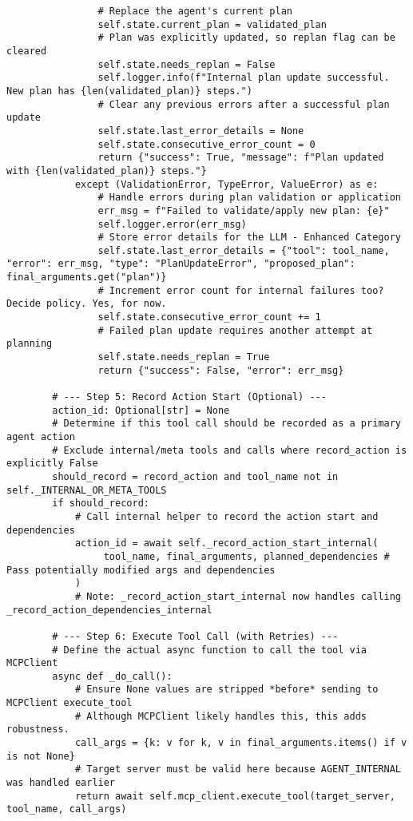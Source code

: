 \documentclass[12pt,a4paper]{article}
\begin{document}
\begin{pageablecode}
\begin{verbatim}
                # Replace the agent's current plan
                self.state.current_plan = validated_plan
                # Plan was explicitly updated, so replan flag can be cleared
                self.state.needs_replan = False
                self.logger.info(f"Internal plan update successful. New plan has {len(validated_plan)} steps.")
                # Clear any previous errors after a successful plan update
                self.state.last_error_details = None
                self.state.consecutive_error_count = 0
                return {"success": True, "message": f"Plan updated with {len(validated_plan)} steps."}
            except (ValidationError, TypeError, ValueError) as e:
                # Handle errors during plan validation or application
                err_msg = f"Failed to validate/apply new plan: {e}"
                self.logger.error(err_msg)
                # Store error details for the LLM - Enhanced Category
                self.state.last_error_details = {"tool": tool_name, "error": err_msg, "type": "PlanUpdateError", "proposed_plan": final_arguments.get("plan")}
                # Increment error count for internal failures too? Decide policy. Yes, for now.
                self.state.consecutive_error_count += 1
                # Failed plan update requires another attempt at planning
                self.state.needs_replan = True
                return {"success": False, "error": err_msg}

        # --- Step 5: Record Action Start (Optional) ---
        action_id: Optional[str] = None
        # Determine if this tool call should be recorded as a primary agent action
        # Exclude internal/meta tools and calls where record_action is explicitly False
        should_record = record_action and tool_name not in self._INTERNAL_OR_META_TOOLS
        if should_record:
            # Call internal helper to record the action start and dependencies
            action_id = await self._record_action_start_internal(
                 tool_name, final_arguments, planned_dependencies # Pass potentially modified args and dependencies
            )
            # Note: _record_action_start_internal now handles calling _record_action_dependencies_internal

        # --- Step 6: Execute Tool Call (with Retries) ---
        # Define the actual async function to call the tool via MCPClient
        async def _do_call():
            # Ensure None values are stripped *before* sending to MCPClient execute_tool
            # Although MCPClient likely handles this, this adds robustness.
            call_args = {k: v for k, v in final_arguments.items() if v is not None}
            # Target server must be valid here because AGENT_INTERNAL was handled earlier
            return await self.mcp_client.execute_tool(target_server, tool_name, call_args)


\end{verbatim}
\end{pageablecode}
\end{document}
